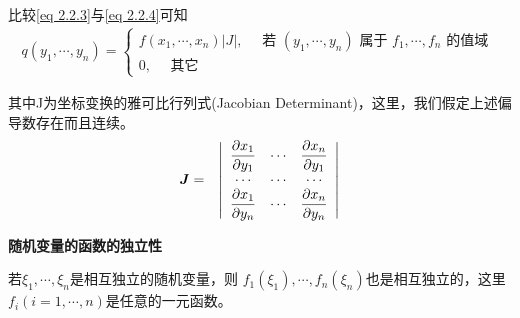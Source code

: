 \begin{enumerate}[1、]
   	   比较\eqref{eq 2.2.3}与\eqref{eq 2.2.4}可知
   	   \vspace{-1em}
		$$ 
		\begin{array}{l}
		q\left(y_{1}, \cdots, y_{n}\right)
		=\left\{\begin{array}{l}
		f\left(x_{1}, \cdots, x_{n}\right)|J|, \quad \text { 若 }\left(y_{1}, \cdots, y_{n}\right) \text { 属于 } f_{1}, \cdots, f_{n} \text { 的值域 } \\
		0,   \quad \text { 其它 }
		\end{array}\right.
		\end{array} $$
	  
	  其中J为坐标变换的雅可比行列式(Jacobian Determinant)，这里，我们假定上述偏导数存在而且连续。
	  \vspace{-1em}
	  \begin{eqnarray}
	  \boldsymbol{ J }& = & \left|\begin{array}{ccc}
	  \dfrac{\partial x_{1}}{\partial y_{1}} & \cdots &\dfrac{\partial x_{n}}{\partial y_{1}} \\
	  \cdots  & \cdots  & \cdots\\
	  \dfrac{\partial x_{1}}{\partial y_{n}} & \cdots &\dfrac{\partial x_{n}}{\partial y_{n}}
	  \end{array}\right| \notag
	  \end{eqnarray}
	  
	  {\bf 随机变量的函数的独立性 } 
	  
	 \begin{theorem}
		若$ \xi_{1}, \cdots, \xi_{n}  $是相互独立的随机变量，则 $ f_{1}\left(\xi_{1}\right), \cdots, f_{n}\left(\xi_{n}\right) $也是相互独立的，这里$ f_{i}(i=1, \cdots, n) $是任意的一元函数。
	 \end{theorem}
\end{enumerate} 

